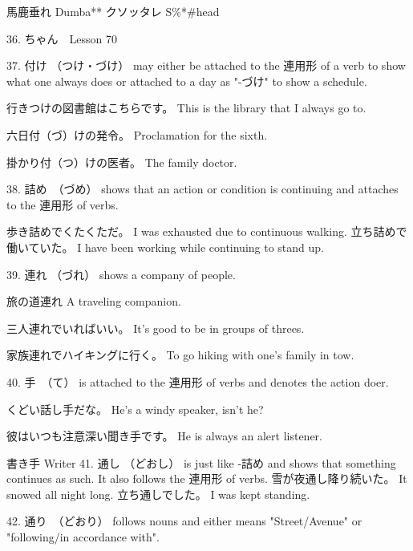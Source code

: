 \par{馬鹿垂れ \hfill\break
Dumba** \hfill\break
\hfill\break
クソッタレ \hfill\break
S\%*\#head }

\par{36. ちゃん　\textrightarrow  Lesson 70  \hfill\break
}

\par{37. 付け （つけ・づけ） may either be attached to the 連用形 of a verb  to show what one always does or attached to a day as "-づけ" to show a schedule. }

\par{行きつけの図書館はこちらです。 \hfill\break
This is the library that I always go to. }

\par{六日付（づ）けの発令。 \hfill\break
Proclamation for the sixth. }

\par{掛かり付（つ）けの医者。 \hfill\break
The family doctor. }

\par{38. 詰め　（づめ） shows that an action or condition is continuing and attaches to the 連用形 of verbs. }

\par{歩き詰めでくたくただ。 \hfill\break
I was exhausted due to continuous walking. \hfill\break
\hfill\break
立ち詰めで働いていた。 \hfill\break
I have been working while continuing to stand up. }

\par{39. 連れ （づれ） shows a company of people. }

\par{旅の道連れ \hfill\break
A traveling companion. }

\par{三人連れでいればいい。 \hfill\break
It's good to be in groups of threes. }

\par{家族連れでハイキングに行く。 \hfill\break
To go hiking with one's family in tow. }

\par{40. 手　（て） is attached to the 連用形 of verbs and denotes the action doer. }

\par{くどい話し手だな。 \hfill\break
He's a windy speaker, isn't he? }

\par{彼はいつも注意深い聞き手です。 \hfill\break
He is always an alert listener. }

\par{書き手 \hfill\break
Writer }
41. 通し （どおし） is just like -詰め and shows that something continues as such. It also follows the 連用形 of verbs. \hfill\break
\hfill\break
雪が夜通し降り続いた。 \hfill\break
It snowed all night long. \hfill\break
\hfill\break
立ち通しでした。 \hfill\break
I was kept standing. 
\par{42. 通り　（どおり） follows nouns and either means "Street\slash Avenue" or "following\slash in accordance with". }

